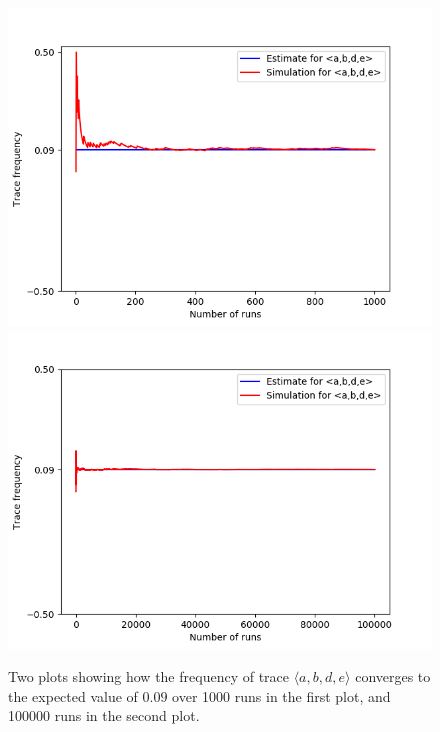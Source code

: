 \begin{figure}%
    \centering
    {{\includegraphics[width=12cm]{figures/abde1.png} }}%
    \qquad
    {{\includegraphics[width=12cm]{figures/abde100.png} }}%
    \caption{Two plots showing how the frequency of trace $\langle a,b,d,e \rangle$ converges to the expected value of $0.09$ over 1000 runs in the first plot, and 100000 runs in the second plot.}%
    \label{fig: abde}%
\end{figure}
%
%
%
%
%
%
